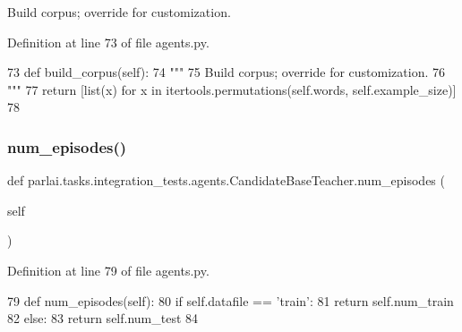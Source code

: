 \begin{DoxyVerb}Build corpus; override for customization.
\end{DoxyVerb}
 

Definition at line 73 of file agents.\+py.


\begin{DoxyCode}
73     \textcolor{keyword}{def }build\_corpus(self):
74         \textcolor{stringliteral}{"""}
75 \textcolor{stringliteral}{        Build corpus; override for customization.}
76 \textcolor{stringliteral}{        """}
77         \textcolor{keywordflow}{return} [list(x) \textcolor{keywordflow}{for} x \textcolor{keywordflow}{in} itertools.permutations(self.words, self.example\_size)]
78 
\end{DoxyCode}
\mbox{\label{classparlai_1_1tasks_1_1integration__tests_1_1agents_1_1CandidateBaseTeacher_aea8447f8dee0c3e60e0f4a444a01e239}} 
\subsubsection{\texorpdfstring{num\+\_\+episodes()}{num\_episodes()}}
{\footnotesize\ttfamily def parlai.\+tasks.\+integration\+\_\+tests.\+agents.\+Candidate\+Base\+Teacher.\+num\+\_\+episodes (\begin{DoxyParamCaption}\item[{}]{self }\end{DoxyParamCaption})}



Definition at line 79 of file agents.\+py.


\begin{DoxyCode}
79     \textcolor{keyword}{def }num\_episodes(self):
80         \textcolor{keywordflow}{if} self.datafile == \textcolor{stringliteral}{'train'}:
81             \textcolor{keywordflow}{return} self.num\_train
82         \textcolor{keywordflow}{else}:
83             \textcolor{keywordflow}{return} self.num\_test
84 
\end{DoxyCode}
\mbox{\label{classparlai_1_1tasks_1_1integration__tests_1_1agents_1_1CandidateBaseTeacher_afff9316bcd22ef04a25e4325cedd2ba8}} 
